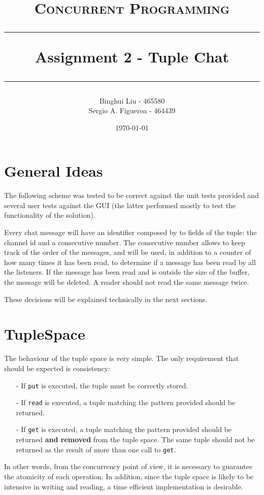 \documentclass[paper=a4, fontsize=11pt]{scrartcl} %
\title{	
\normalfont \normalsize 
\textsc{Concurrent Programming} \\ [25pt] %
\rule{\linewidth}{0.5pt}
\huge Assignment 2 - Tuple Chat \\ %
\rule{\linewidth}{2pt}
}
\author{Binghui Liu - 465580\\
Sergio A. Figueroa - 464439} %
\date{\normalsize\today} %
\begin{document}
\maketitle %

\section{General Ideas}
The following scheme was tested to be correct against the unit tests provided and several user tests against the GUI (the latter performed mostly to test the functionality of the solution).

Every chat message will have an identifier composed by to fields of the tuple: the channel id and a consecutive number. The consecutive number allows to keep track of the order of the messages, and will be used, in addition to a counter of how many times it has been read, to determine if a message has been read by all the listeners. If the message has been read and is outside the size of the buffer, the message will be deleted. A reader should not read the same message twice.

These decisions will be explained technically in the next sections.

\section{TupleSpace}

The behaviour of the tuple space is very simple. The only requirement that should be expected is consistency:

\begin{itemize}
	\item[-] If \verb|put| is executed, the tuple must be correctly stored.
	\item[-] If \verb|read| is executed, a tuple matching the pattern provided should be returned.
	\item[-] If \verb|get| is executed, a tuple matching the pattern provided should be returned \textbf{and removed} from the tuple space. The same tuple should not be returned as the result of more than one call to \verb|get|.
\end{itemize}


In other words, from the concurrency point of view, it is necessary to guarantee the atomicity of each operation. In addition, since the tuple space is likely to be intensive in writing and reading, a time efficient implementation is desirable.
\end{document}
